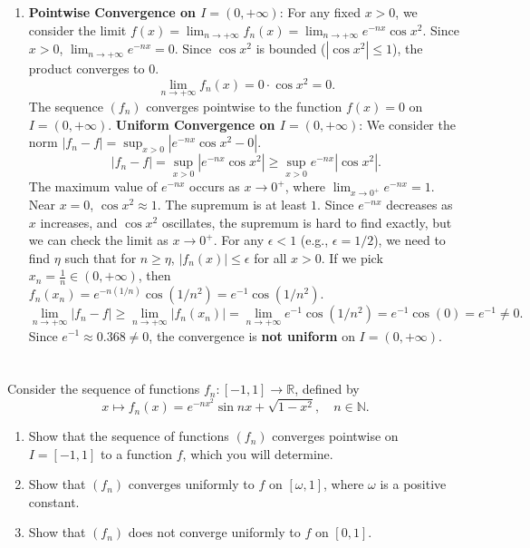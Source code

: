 \documentclass[12pt]{article}
\begin{document}
\begin{correctionbox}
\begin{enumerate}
    \item \textbf{Pointwise Convergence on $I=(0, +\infty)$}:
    For any fixed $x > 0$, we consider the limit $f(x) = \lim_{n \to +\infty} f_n(x) = \lim_{n \to +\infty} e^{-nx}\cos x^2$.
    Since $x > 0$, $\lim_{n \to +\infty} e^{-nx} = 0$. Since $\cos x^2$ is bounded ($|\cos x^2| \leq 1$), the product converges to $0$.
    $$ \lim_{n \to +\infty} f_n(x) = 0 \cdot \cos x^2 = 0.$$
    The sequence $(f_n)$ converges pointwise to the function $f(x) = 0$ on $I=(0, +\infty)$.
    \textbf{Uniform Convergence on $I=(0, +\infty)$}:
    We consider the norm $|f_n - f| = \sup_{x > 0} |e^{-nx}\cos x^2 - 0|$.
    $$ |f_n - f| = \sup_{x > 0} |e^{-nx}\cos x^2| \geq \sup_{x > 0} e^{-nx}|\cos x^2|. $$
    The maximum value of $e^{-nx}$ occurs as $x \to 0^+$, where $\lim_{x \to 0^+} e^{-nx} = 1$.
    Near $x=0$, $\cos x^2 \approx 1$.
    The supremum is at least $1$. Since $e^{-nx}$ decreases as $x$ increases, and $\cos x^2$ oscillates, the supremum is hard to find exactly, but we can check the limit as $x \to 0^+$.
    For any $\epsilon < 1$ (e.g., $\epsilon=1/2$), we need to find $\eta$ such that for $n \geq \eta$, $|f_n(x)| \leq \epsilon$ for all $x > 0$.
    If we pick $x_n = \frac{1}{n} \in (0, +\infty)$, then $f_n(x_n) = e^{-n(1/n)}\cos (1/n^2) = e^{-1}\cos (1/n^2)$.
    $$\lim_{n \to +\infty} |f_n - f| \geq \lim_{n \to +\infty} |f_n(x_n)| = \lim_{n \to +\infty} e^{-1}\cos(1/n^2) = e^{-1}\cos(0) = e^{-1} \neq 0.$$
    Since $e^{-1} \approx 0.368 \neq 0$, the convergence is \textbf{not uniform} on $I=(0, +\infty)$.
\end{enumerate}
\end{correctionbox}

\section{}
Consider the sequence of functions $f_n : [-1, 1] \to \mathbb{R}$, defined by
$$x \mapsto f_n(x) = e^{-nx^2}\sin nx + \sqrt{1-x^2}, \quad n \in \mathbb{N}.$$

\begin{enumerate}
    \item Show that the sequence of functions $(f_n)$ converges pointwise on $I = [-1, 1]$ to a function $f$, which you will determine.
    \item Show that $(f_n)$ converges uniformly to $f$ on $[\omega, 1]$, where $\omega$ is a positive constant.
    \item Show that $(f_n)$ does not converge uniformly to $f$ on $[0, 1]$.
\end{enumerate}
\end{document}
